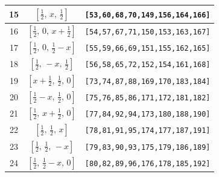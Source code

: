 \documentclass[fleqn,8pt]{jsarticle}
\begin{document}
\begin{longtable}{ccc}
15 & $\left[ \frac{1}{2},\, x,\, \frac{1}{2} \right]$ & {\tt [53,60,68,70,149,156,164,166]} \\ \hline
16 & $\left[ \frac{1}{2},\, 0,\, x + \frac{1}{2} \right]$ & {\tt [54,57,67,71,150,153,163,167]} \\ \hline
17 & $\left[ \frac{1}{2},\, 0,\, \frac{1}{2} - x \right]$ & {\tt [55,59,66,69,151,155,162,165]} \\ \hline
18 & $\left[ \frac{1}{2},\, - x,\, \frac{1}{2} \right]$ & {\tt [56,58,65,72,152,154,161,168]} \\ \hline
19 & $\left[ x + \frac{1}{2},\, \frac{1}{2},\, 0 \right]$ & {\tt [73,74,87,88,169,170,183,184]} \\ \hline
20 & $\left[ \frac{1}{2} - x,\, \frac{1}{2},\, 0 \right]$ & {\tt [75,76,85,86,171,172,181,182]} \\ \hline
21 & $\left[ \frac{1}{2},\, x + \frac{1}{2},\, 0 \right]$ & {\tt [77,84,92,94,173,180,188,190]} \\ \hline
22 & $\left[ \frac{1}{2},\, \frac{1}{2},\, x \right]$ & {\tt [78,81,91,95,174,177,187,191]} \\ \hline
23 & $\left[ \frac{1}{2},\, \frac{1}{2},\, - x \right]$ & {\tt [79,83,90,93,175,179,186,189]} \\ \hline
24 & $\left[ \frac{1}{2},\, \frac{1}{2} - x,\, 0 \right]$ & {\tt [80,82,89,96,176,178,185,192]} \\
\end{longtable}
\renewcommand{\arraystretch}{1.2}
\end{document}
